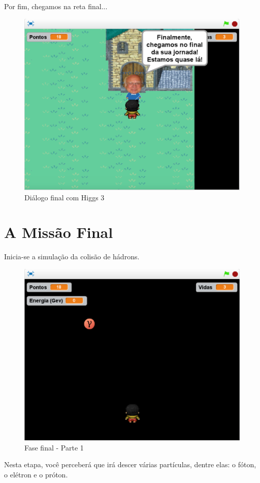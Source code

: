 \documentclass[12pt,fleqn]{book} %
\begin{document}
Por fim, chegamos na reta final...

\begin{figure}[h]
	\centering
	\includegraphics[width=0.65 \textwidth]{Produto/jogo_19}
	\caption{Diálogo final com Higgs 3}
	\label{fig:app_a:jogo19}
\end{figure}

\newpage

\section{A Missão Final}

Inicia-se a simulação da colisão de hádrons.

\begin{figure}[h]
	\centering
	\includegraphics[width=0.65 \textwidth]{Produto/final1}
	\caption{Fase final - Parte 1}
	\label{fig:app_a:final1}
\end{figure}

Nesta etapa, você perceberá que irá descer várias partículas, dentre elas: o fóton, o elétron e o próton.
\end{document}
